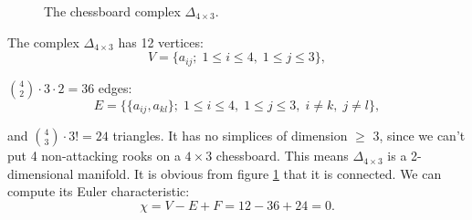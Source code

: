 \documentclass[11pt,a4paper]{article}
\theoremstyle{plain}
\theoremstyle{definition}
\theoremstyle{remark}
\begin{document}
\begin{figure}[h]
\centering
{}
\caption{The chessboard complex $\Delta_{4\times3}$.}
\label{fig:delta43}
\end{figure}

\noindent
The complex $\Delta_{4\times3}$ has 12 vertices:
$$V = \{a_{ij}; \; 1 \leq i \leq 4, \; 1 \leq j \leq 3 \},$$

\noindent
$\binom{4}{2} \cdot 3 \cdot 2 = 36$ edges:
$$E = \{ \{a_{ij}, a_{kl}\}; \; 1 \leq i \leq 4, \; 1 \leq j \leq 3, \; i \neq k, \; j \neq l \},$$

\noindent
and $\binom{4}{3} \cdot 3! = 24$ triangles. It has no simplices of dimension $\geq$ 3, since we can't put 4 non-attacking rooks
on a $4 \times 3$ chessboard. This means $\Delta_{4 \times 3}$ is a 2-dimensional manifold. It is obvious from figure \ref{fig:delta43}
that it is connected. We can compute its Euler characteristic:
$$\chi = V - E + F = 12 - 36 + 24 = 0.$$ 
\end{document}
